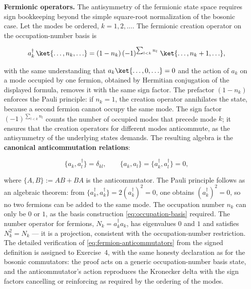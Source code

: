 \medskip\noindent\textbf{Fermionic operators.}
The antisymmetry of the fermionic state space requires sign bookkeeping beyond the simple square-root normalization of the bosonic case. Let the modes be ordered, $k = 1, 2, \ldots$. The fermionic creation operator on the occupation-number basis is
\begin{linenomath}
    \begin{equation*}
        a_k^\dagger\,\ket{\ldots, n_k, \ldots}
        = (1 - n_k)\,(-1)^{\sum_{l < k} n_l}\;\ket{\ldots, n_k + 1, \ldots},
    \end{equation*}
\end{linenomath}
with the same understanding that $a_k\ket{\ldots, 0, \ldots} = 0$ and the action of $a_k$ on a mode occupied by one fermion, obtained by Hermitian conjugation of the displayed formula, removes it with the same sign factor. The prefactor $(1 - n_k)$ enforces the Pauli principle: if $n_k = 1$, the creation operator annihilates the state, because a second fermion cannot occupy the same mode. The sign factor $(-1)^{\sum_{l<k}n_l}$ counts the number of occupied modes that precede mode $k$; it ensures that the creation operators for different modes anticommute, as the antisymmetry of the underlying states demands. The resulting algebra is the \textbf{canonical anticommutation relations}:
\begin{linenomath}
    \begin{equation}
        \{a_k, a_l^\dagger\} = \delta_{kl},
        \qquad
        \{a_k, a_l\} = \{a_k^\dagger, a_l^\dagger\} = 0,
        \label{eq:fermion-anticommutators}
    \end{equation}
\end{linenomath}
where $\{A, B\} := AB + BA$ is the anticommutator. The Pauli principle follows as an algebraic theorem: from $\{a_k^\dagger, a_k^\dagger\} = 2(a_k^\dagger)^2 = 0$, one obtains $(a_k^\dagger)^2 = 0$, so no two fermions can be added to the same mode. The occupation number $n_k$ can only be $0$ or $1$, as the basis construction \eqref{eq:occupation-basis} required. The number operator for fermions, $N_k = a_k^\dagger a_k$, has eigenvalues $0$ and $1$ and satisfies $N_k^2 = N_k$ --- it is a projection, consistent with the occupation-number restriction. The detailed verification of \eqref{eq:fermion-anticommutators} from the signed definition is assigned to Exercise~4, with the same honesty declaration as for the bosonic commutators: the proof acts on a generic occupation-number basis state, and the anticommutator's action reproduces the Kronecker delta with the sign factors cancelling or reinforcing as required by the ordering of the modes.


